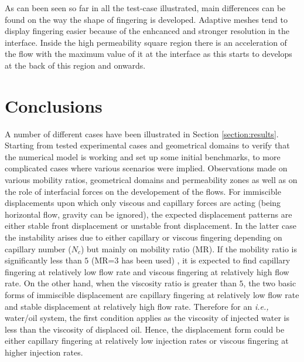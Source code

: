 \documentclass[preprint,authoryear,12pt]{elsarticle}
\newcommand{\ie}{{\it i.e., }}
\begin{document}
\medskip 
As can been seen so far in all the test-case illustrated, main differences can be found on the way the shape of fingering is developed. Adaptive meshes tend to display fingering easier because of the enhcanced and stronger resolution in the interface. Inside the high permeability square region there is an acceleration of the flow with the maximum value of it at the interface as this starts to develops at the back of this region and onwards. %

\section{Conclusions}\label{Section:Conclusion}

\medskip
A number of different cases have been illustrated in Section \ref{section:results}. Starting from tested experimental cases and geometrical domains to verify that the numerical model is working and set up some initial benchmarks, to more complicated cases where various scenarios were implied. Observations made on various mobility ratios, geometrical domains and permeability zones as well as on the role of interfacial forces on the developement of the flows. For immiscible displacements upon which only viscous and capillary forces are acting (being horizontal flow, gravity can be ignored), the expected displacement patterns are either stable front displacement or unstable front displacement. In the latter case the instability arises due to either capillary or viscous fingering depending on capillary number ($N_{c}$) but mainly on mobility ratio (MR). If the mobility ratio is significantly less than $5$ (MR=$3$ has been used) , it is expected to find capillary fingering at relatively low flow rate and viscous fingering at relatively high flow rate. On the other hand, when the viscosity ratio is greater than $5$, the two basic forms of immiscible displacement are capillary fingering at relatively low flow rate and stable displacement at relatively high flow rate. Therefore for an \ie water/oil system, the first condition applies as the viscosity of injected water is less than the viscosity of displaced oil. Hence, the displacement form could be either capillary fingering at relatively low injection rates or viscous fingering at higher injection rates. 
\end{document}
